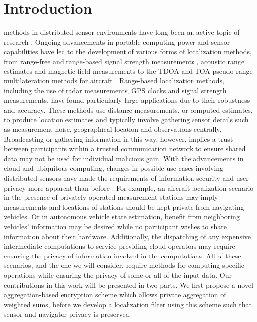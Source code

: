 \documentclass[10pt,letterpaper,oneside,twocolumn,journal]{IEEEtran}
\theoremstyle{definition}
\theoremstyle{definition}
\theoremstyle{remark}
\begin{document}
\section{Introduction}
 methods in distributed sensor environments have long been an active topic of research \cite{pierceIntroductionLoran1946,liContributedReviewSourcelocalization2016}. Ongoing advancements in portable computing power and sensor capabilities have led to the development of various forms of localization methods, from range-free and range-based signal strength measurements \cite{wangConvexCombinationSource2018,heRangeFreeLocalizationSchemes2003}, acoustic range estimates \cite{beutlerNewNonlinearFiltering2004} and magnetic field measurements \cite{sieblerLocalizationMagneticField2020} to the TDOA and TOA pseudo-range multilateration methods for aircraft \cite{liContributedReviewSourcelocalization2016}. Range-based localization methods, including the use of radar measurements, GPS clocks and signal strength measurements, have found particularly large applications due to their robustness and accuracy. These methods use distance measurements, or computed estimates, to produce location estimates and typically involve gathering sensor details such as measurement noise, geographical location and observations centrally. Broadcasting or gathering information in this way, however, implies a trust between participants within a trusted communication network to ensure shared data may not be used for individual malicious gain. With the advancements in cloud and ubiquitous computing, changes in possible use-cases involving distributed sensors have made the requirements of information security and user privacy more apparent than before \cite{brennerSecretProgramExecution2011,renSecurityChallengesPublic2012}. For example, an aircraft localization scenario in the presence of privately operated measurement stations may imply measurements and locations of stations should be kept private from navigating vehicles. Or in autonomous vehicle state estimation, benefit from neighboring vehicles' information may be desired while no participant wishes to share information about their hardware. Additionally, the dispatching of any expensive intermediate computations to service-providing cloud operators may require ensuring the privacy of information involved in the computations. All of these scenarios, and the one we will consider, require methods for computing specific operations while ensuring the privacy of some or all of the input data. Our contributions in this work will be presented in two parts. We first propose a novel aggregation-based encryption scheme which allows private aggregation of weighted sums, before we develop a localization filter using this scheme such that sensor and navigator privacy is preserved.
\end{document}
